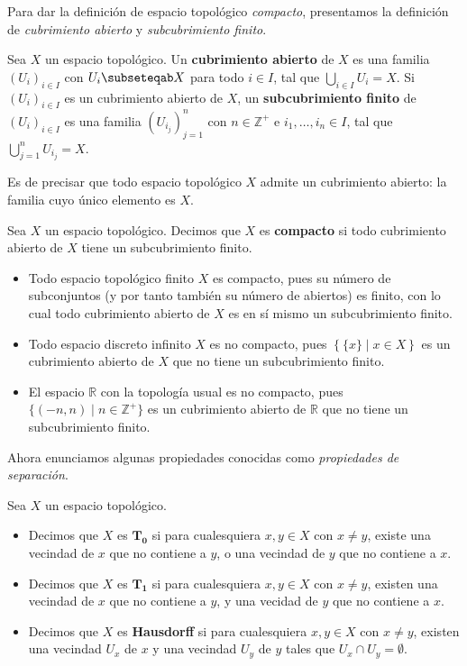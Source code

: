 Para dar la definición de espacio topológico \textit{compacto}, presentamos la definición de \textit{cubrimiento abierto} y \textit{subcubrimiento finito}.
\begin{Def}
   Sea $X$ un espacio topológico. Un \textbf{cubrimiento abierto} de $X$ es una familia $\left(U_i\right)_{i\in I}$ con $U_i\subseteqab X$ para todo $i\in I$, tal que $\bigcup_{i\in I}U_i=X$. Si $\left( U_i\right)_{i\in I}$ es un cubrimiento abierto de $X$, un \textbf{subcubrimiento finito} de $\left( U_i\right)_{i\in I}$ es una familia $\left(U_{i_j} \right)_{j=1}^{n}$ con $n\in \mathbb{Z}^+$ e $i_1,\dots,i_n\in I$, tal que $\bigcup_{j=1}^{n}U_{i_j}=X$.
\end{Def}
Es de precisar que todo espacio topológico $X$ admite un cubrimiento abierto: la familia cuyo único elemento es $X$.
\begin{Def}
   Sea $X$ un espacio topológico. Decimos que $X$ es \textbf{compacto} si todo cubrimiento abierto de $X$ tiene un subcubrimiento finito.
\end{Def}
\begin{Ejm}
   \phantom{o}
   \begin{itemize}
      \item Todo espacio topológico finito $X$ es compacto, pues su número de subconjuntos (y por tanto también su número de abiertos) es finito, con lo cual todo cubrimiento abierto de $X$ es en sí mismo un subcubrimiento finito.
      \item Todo espacio discreto infinito $X$ es no compacto, pues $\left\lbrace \{x\}\mid x\in X\right\rbrace$ es un cubrimiento abierto de $X$ que no tiene un subcubrimiento finito.
      \item El espacio $\mathbb{R}$ con la topología usual es no compacto, pues $\{(-n,n)\mid n\in \mathbb{Z}^+\}$ es un cubrimiento abierto de $\mathbb{R}$ que no tiene un subcubrimiento finito.
   \end{itemize}
\end{Ejm}
Ahora enunciamos algunas propiedades conocidas como \textit{propiedades de separación}.
\begin{Def}
   Sea $X$ un espacio topológico.
   \begin{itemize}
      \item Decimos que $X$ es $\bm{T_0}$ si para cualesquiera $x,y\in X$ con $x\ne y$, existe una vecindad de $x$ que no contiene a $y$, o una vecindad de $y$ que no contiene a $x$. 
      \item Decimos que $X$ es $\bm{T_1}$ si para cualesquiera $x,y\in X$ con $x\ne y$, existen una vecindad de $x$ que no contiene a $y$, y una vecidad de $y$ que no contiene a $x$.
      \item Decimos que $X$ es \textbf{Hausdorff} si para cualesquiera $x,y\in X$ con $x\ne y$, existen una vecindad $U_x$ de $x$ y una vecindad $U_y$ de $y$ tales que $U_x\cap U_y=\emptyset$.
   \end{itemize}
\end{Def}
